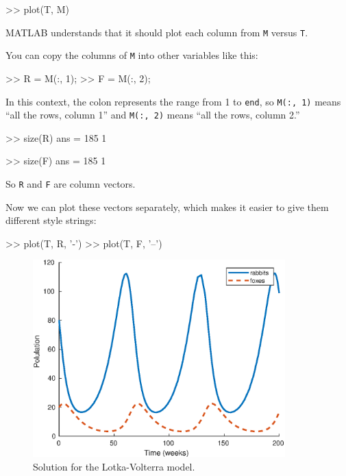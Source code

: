 \begin{code}
>> plot(T, M)
\end{code}

MATLAB understands that it should plot each column from {\tt M}
versus {\tt T}.


You can copy the columns of {\tt M} into other variables like
this:

\begin{code}
>> R = M(:, 1);
>> F = M(:, 2);
\end{code}

In this context, the colon represents the range from 1 to {\tt end},
so {\tt M(:, 1)} means ``all the rows, column 1'' and
{\tt M(:, 2)} means ``all the rows, column 2.''

\begin{code}
>> size(R)
ans = 185     1

>> size(F)
ans = 185     1
\end{code}

So {\tt R} and {\tt F} are column vectors.


Now we can plot these vectors separately, which makes it easier to give them different style strings:

\begin{code}
>> plot(T, R, '-')
>> plot(T, F, '--')
\end{code}

\begin{figure}[ht]
\centerline{\includegraphics[height=3in]{book/figs/lotka.eps}}
\caption{Solution for the Lotka-Volterra model.}
\label{fig:lotka}
\end{figure}


